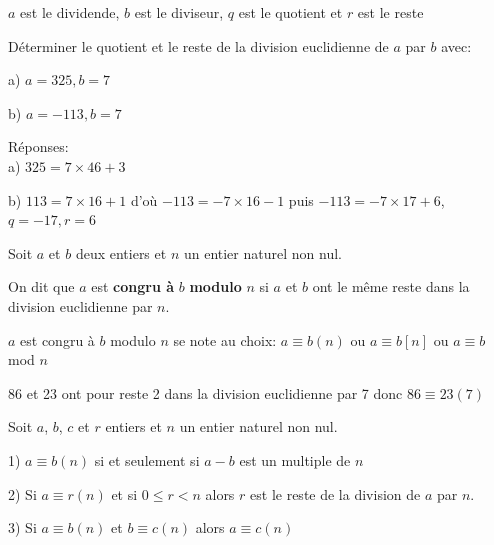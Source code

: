 \documentclass[french]{book}
\begin{document}
\begin{rem}

$a$ est le dividende,
$b$ est le diviseur,
$q$ est le quotient et
$r$ est le reste
\end{rem}

\begin{exemple}
Déterminer le quotient et le reste de la division euclidienne de $a$ par $b$ avec:

a) $a=325, b=7$

b) $a=-113, b=7$


Réponses: \\

a) $325=7 \times 46+3$

b) $113=7 \times 16 +1$ d'où $-113=-7 \times 16 -1$ puis $-113=-7 \times 17+6$, $q=-17, r=6$


\end{exemple}






\begin{defn}
Soit $a$ et $b$ deux entiers et $n$ un entier naturel non nul.

On dit que $a$ est \textbf{congru à} $b$ \textbf{modulo} $n$ si $a$ et $b$ ont le même reste dans la division euclidienne par $n$.

\end{defn}

\begin{rem}

$a$ est congru à $b$ modulo $n$ se note au choix:
$a \equiv b \left( n\right) $ ou $a \equiv b \left[ n\right] $ ou $a \equiv b$ mod $ n$
 
 \end{rem}
 
\begin{exemple}
86 et 23 ont pour reste 2 dans la division euclidienne par 7 donc $86\equiv 23 \left( 7\right) $

\end{exemple}

\begin{thm}
Soit $a$, $b$, $c$ et $r$ entiers et $n$ un entier naturel non nul.

1) $a \equiv b \left( n\right) $ si et seulement si $a-b$ est un multiple de $n$

2) Si $a \equiv r \left( n\right) $ et si $0 \leq r < n$ alors $r$ est le reste de la division de $a$ par $n$.

3) Si $a \equiv b \left( n\right) $ et  $b \equiv c \left( n\right) $ alors $a \equiv c \left( n\right) $

\end{thm}
\end{document}
